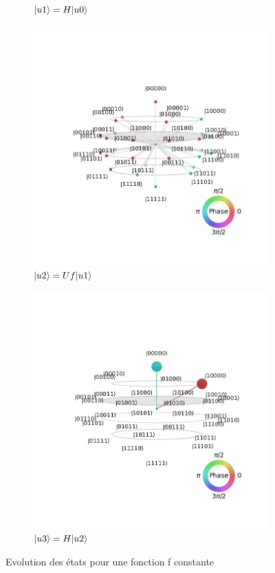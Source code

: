 \documentclass[12pt,a4paper]{article}
\DeclarePairedDelimiter\ket{\lvert}{\rangle}
\begin{document}
\begin{figure}[bth]
\begin{subfigure}[b]{0.3\textwidth}
      \caption{$\ket{u1}=H\ket{u0}$}
  \end{subfigure}
  \begin{subfigure}[b]{0.3\textwidth}
      \centering
      \includegraphics[width=\textwidth]{images/visualization_constant_2_u2.png}
      \caption{$\ket{u2}=Uf\ket{u1}$}
  \end{subfigure}
  \begin{subfigure}[b]{0.3\textwidth}
    \centering
    \includegraphics[width=\textwidth]{images/visualization_constant_2_u3.png}
    \caption{$\ket{u3}=H\ket{u2}$}
\end{subfigure}
     \caption{Evolution des états pour une fonction f constante}
\end{figure}
\end{document}
